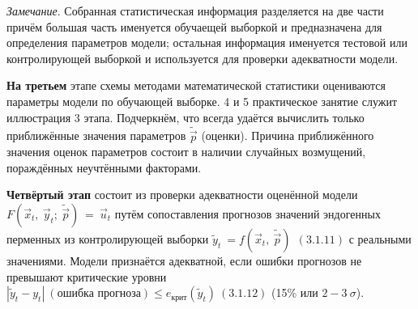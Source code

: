 \documentclass[12pt,a4paper]{article}
\begin{document}
\textit{Замечание}. Собранная статистическая информация разделяется на две части причём большая часть именуется обучаещей выборкой и предназначена для определения параметров модели; остальная информация именуется тестовой или контролирующей выборкой и используется для проверки адекватности модели.

	\textbf{На третьем} этапе схемы методами математической статистики оцениваются параметры модели по обучающей выборке. 4 и 5 практическое занятие служит иллюстрация 3 этапа. Подчеркнём, что всегда удаётся вычислить только приближённые значения параметров $\displaystyle \widetilde{\vec{p}}$ (оценки). Причина приближённого значения оценок параметров состоит в наличии случайных возмущений, пораждённых неучтёнными факторами.

	\textbf{Четвёртый этап} состоит из проверки адекватности оценённой модели \\ $\displaystyle F\left(\vec{x}_{t} ,\ \vec{y}_{t} ;\ \widetilde{\vec{p}}\right) \ =\ \vec{u}_{t}$ путём сопоставления прогнозов значений эндогенных перменных из контролирующей выборки $\displaystyle \tilde{y}_{t} \ =f\left(\vec{x}_{t} ,\ \widetilde{\vec{p}}\right) \ \ ( 3.1.11)$ с реальными значениями. Модели признаётся адекватной, если ошибки прогнозов не превышают критические уровни $\displaystyle |\tilde{y}_{t} -y_{t} |\ \left(\text{ошибка прогноза}\right) \leq e_{\text{крит}}\left(\tilde{y}_{t}\right) \ ( 3.1.12)$ (15\% или $\displaystyle 2-3\ \sigma $).
\end{document}
